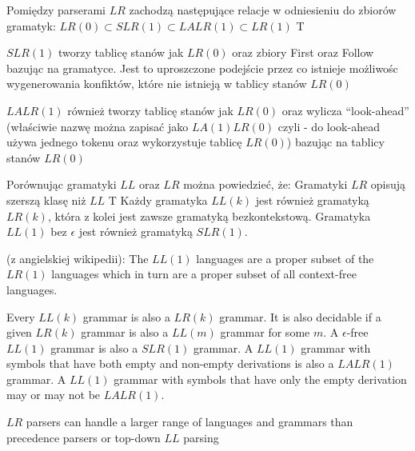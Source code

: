 \answer
{Pomiędzy parserami $LR$ zachodzą następujące relacje w odniesieniu do zbiorów gramatyk:}
{$LR(0) \subset SLR(1) \subset LALR(1) \subset LR(1)$}
{T}
{$SLR(1)$ tworzy tablicę stanów jak $LR(0)$ oraz zbiory First oraz Follow bazując na gramatyce. Jest to uproszczone podejście przez co istnieje możliwośc wygenerowania konfiktów, które nie istnieją w tablicy stanów $LR(0)$

$LALR(1)$ również tworzy tablicę stanów jak $LR(0)$ oraz wylicza ``look-ahead'' (właściwie nazwę można zapisać jako $LA(1)LR(0)$ czyli - do look-ahead używa jednego tokenu oraz wykorzystuje tablicę $LR(0)$) bazując na tablicy stanów $LR(0)$}
{}


\answer
{Porównując gramatyki $LL$ oraz $LR$ można powiedzieć, że:}
{Gramatyki $LR$ opisują szerszą klasę niż $LL$}
{T}
{Każdy gramatyka $LL(k)$ jest również gramatyką $LR(k)$, która z kolei jest zawsze gramatyką bezkontekstową.
Gramatyka $LL(1)$ bez $\epsilon$ jest również gramatyką $SLR(1)$.}
{(z angielskiej wikipedii):
The $LL(1)$ languages are a proper subset of the $LR(1)$ languages which in turn are a proper subset of all context-free languages.

Every $LL(k)$ grammar is also a $LR(k)$ grammar. It is also decidable if a given $LR(k)$ grammar is also a $LL(m)$ grammar for some $m$. A $\epsilon$-free $LL(1)$ grammar is also a $SLR(1)$ grammar. A $LL(1)$ grammar with symbols that have both empty and non-empty derivations is also a $LALR(1)$ grammar. A $LL(1)$ grammar with symbols that have only the empty derivation may or may not be $LALR(1)$.

$LR$ parsers can handle a larger range of languages and grammars than precedence parsers or top-down $LL$ parsing}




